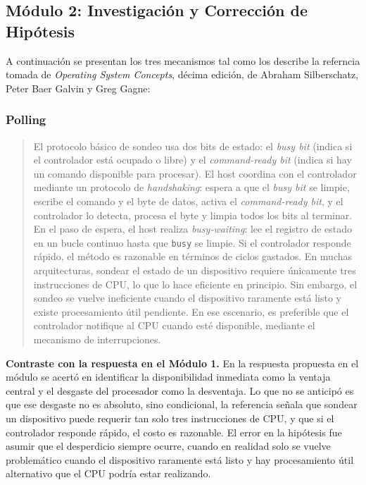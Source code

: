 \documentclass[12pt,letterpaper]{article}
\begin{document}
\subsection*{Módulo 2: Investigación y Corrección de Hipótesis}
A continuación se presentan los tres mecanismos tal como los describe la referncia tomada de \textit{Operating System Concepts}, décima edición, de Abraham Silberschatz, Peter Baer Galvin y Greg Gagne:

\subsubsection*{Polling}
\begin{quote}
  El protocolo básico de sondeo usa dos bits de estado: el \textit{busy bit} (indica si el controlador está
  ocupado o libre) y el \textit{command-ready bit} (indica si hay un comando disponible para procesar).
  El host coordina con el controlador mediante un protocolo de \textit{handshaking}: espera a que el
  \textit{busy bit} se limpie, escribe el comando y el byte de datos, activa el \textit{command-ready bit},
  y el controlador lo detecta, procesa el byte y limpia todos los bits al terminar.\\
  
  En el paso de espera, el host realiza \textit{busy-waiting}: lee el registro de estado en un bucle continuo
  hasta que \texttt{busy} se limpie. Si el controlador responde rápido, el método es razonable en términos de
  ciclos gastados. En muchas arquitecturas, sondear el estado de un dispositivo requiere únicamente tres
  instrucciones de CPU, lo que lo hace eficiente en principio. Sin embargo, el sondeo se vuelve ineficiente
  cuando el dispositivo raramente está listo y existe procesamiento útil pendiente. En ese escenario, es
  preferible que el controlador notifique al CPU cuando esté disponible, mediante el mecanismo de interrupciones.
\end{quote}

\textbf{Contraste con la respuesta en el Módulo 1.}
En la respuesta propuesta en el módulo se acertó en identificar la disponibilidad inmediata como la ventaja
central y el desgaste del procesador como la desventaja. Lo que no se anticipó es que ese desgaste no es
absoluto, sino condicional, la referencia señala que sondear un dispositivo puede requerir tan solo tres
instrucciones de CPU, y que si el controlador responde rápido, el costo es razonable. El error en la hipótesis
fue asumir que el desperdicio siempre ocurre, cuando en realidad solo se vuelve problemático cuando el
dispositivo raramente está listo y hay procesamiento útil alternativo que el CPU podría estar realizando.
\end{document}
